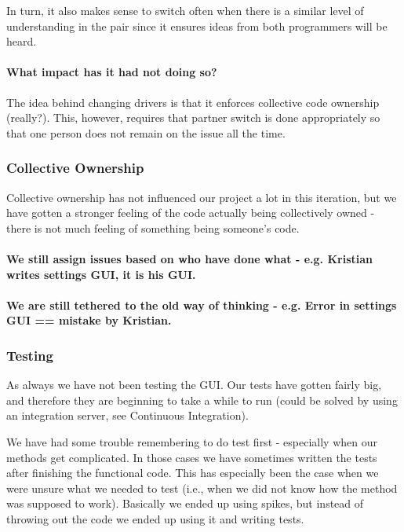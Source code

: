 In turn, it also makes sense to switch often when there is a similar level of understanding in the pair since it ensures ideas from both programmers will be heard.


\paragraph{What impact has it had not doing so?}
The idea behind changing drivers is that it enforces collective code ownership (really?). This, however, requires that partner switch is done appropriately so that one person does not remain on the issue all the time.

\subsubsection{Collective Ownership}
Collective ownership has not influenced our project a lot in this iteration, but we have gotten a stronger feeling of the code actually being collectively owned - there is not much feeling of something being someone’s code.

\paragraph{We still assign issues based on who have done what - e.g. Kristian writes settings GUI, it is his GUI.}

\paragraph{We are still tethered to the old way of thinking - e.g. Error in settings GUI == mistake by Kristian.}

\subsubsection{Testing}
As always we have not been testing the GUI. Our tests have gotten fairly big, and therefore they are beginning to take a while to run (could be solved by using an integration server, see Continuous Integration).

We have had some trouble remembering to do test first - especially when our methods get complicated. In those cases we have sometimes written the tests after finishing the functional code. This has especially been the case when we were unsure what we needed to test (i.e., when we did not know how the method was supposed to work). Basically we ended up using spikes, but instead of throwing out the code we ended up using it and writing tests. 

